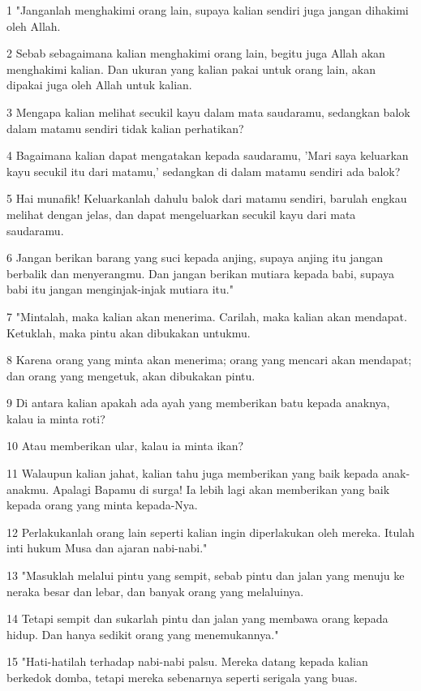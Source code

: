 \par 1 "Janganlah menghakimi orang lain, supaya kalian sendiri juga jangan dihakimi oleh Allah.
\par 2 Sebab sebagaimana kalian menghakimi orang lain, begitu juga Allah akan menghakimi kalian. Dan ukuran yang kalian pakai untuk orang lain, akan dipakai juga oleh Allah untuk kalian.
\par 3 Mengapa kalian melihat secukil kayu dalam mata saudaramu, sedangkan balok dalam matamu sendiri tidak kalian perhatikan?
\par 4 Bagaimana kalian dapat mengatakan kepada saudaramu, 'Mari saya keluarkan kayu secukil itu dari matamu,' sedangkan di dalam matamu sendiri ada balok?
\par 5 Hai munafik! Keluarkanlah dahulu balok dari matamu sendiri, barulah engkau melihat dengan jelas, dan dapat mengeluarkan secukil kayu dari mata saudaramu.
\par 6 Jangan berikan barang yang suci kepada anjing, supaya anjing itu jangan berbalik dan menyerangmu. Dan jangan berikan mutiara kepada babi, supaya babi itu jangan menginjak-injak mutiara itu."
\par 7 "Mintalah, maka kalian akan menerima. Carilah, maka kalian akan mendapat. Ketuklah, maka pintu akan dibukakan untukmu.
\par 8 Karena orang yang minta akan menerima; orang yang mencari akan mendapat; dan orang yang mengetuk, akan dibukakan pintu.
\par 9 Di antara kalian apakah ada ayah yang memberikan batu kepada anaknya, kalau ia minta roti?
\par 10 Atau memberikan ular, kalau ia minta ikan?
\par 11 Walaupun kalian jahat, kalian tahu juga memberikan yang baik kepada anak-anakmu. Apalagi Bapamu di surga! Ia lebih lagi akan memberikan yang baik kepada orang yang minta kepada-Nya.
\par 12 Perlakukanlah orang lain seperti kalian ingin diperlakukan oleh mereka. Itulah inti hukum Musa dan ajaran nabi-nabi."
\par 13 "Masuklah melalui pintu yang sempit, sebab pintu dan jalan yang menuju ke neraka besar dan lebar, dan banyak orang yang melaluinya.
\par 14 Tetapi sempit dan sukarlah pintu dan jalan yang membawa orang kepada hidup. Dan hanya sedikit orang yang menemukannya."
\par 15 "Hati-hatilah terhadap nabi-nabi palsu. Mereka datang kepada kalian berkedok domba, tetapi mereka sebenarnya seperti serigala yang buas.
